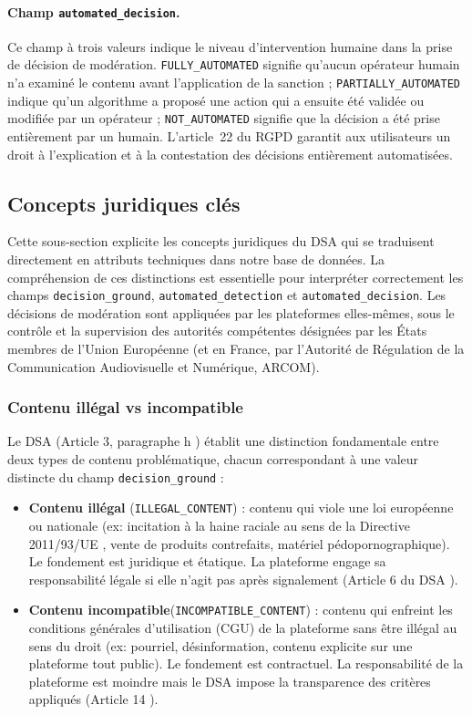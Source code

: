 \documentclass[10pt,twocolumn,a4paper]{article}
\begin{document}
\paragraph{Champ \texttt{automated\_decision}.} Ce champ à trois valeurs indique le niveau d'intervention humaine dans la prise de décision de modération. \texttt{FULLY\_AUTOMATED} signifie qu'aucun opérateur humain n'a examiné le contenu avant l'application de la sanction ; \texttt{PARTIALLY\_AUTOMATED} indique qu'un algorithme a proposé une action qui a ensuite été validée ou modifiée par un opérateur ; \texttt{NOT\_AUTOMATED} signifie que la décision a été prise entièrement par un humain. L'article~22 du RGPD \cite{rgpd} garantit aux utilisateurs un droit à l'explication et à la contestation des décisions entièrement automatisées.


\subsection{Concepts juridiques clés}

Cette sous-section explicite les concepts juridiques du DSA qui se traduisent directement en attributs techniques dans notre base de données. La compréhension de ces distinctions est essentielle pour interpréter correctement les champs \texttt{decision\_ground}, \texttt{automated\_detection} et \texttt{automated\_decision}. Les décisions de modération sont appliquées par les plateformes elles-mêmes, sous le contrôle et la supervision des autorités compétentes désignées par les États membres de l'Union Européenne (et en France, par l'Autorité de Régulation de la Communication Audiovisuelle et Numérique, ARCOM).

\subsubsection{Contenu illégal vs incompatible}

Le DSA (Article 3, paragraphe h \cite{dsa2022}) établit une distinction fondamentale entre deux types de contenu problématique, chacun correspondant à une valeur distincte du champ \texttt{decision\_ground} :

\begin{itemize}
    \item \textbf{Contenu illégal} (\texttt{ILLEGAL\_CONTENT}) : contenu qui viole une loi européenne ou nationale (ex: incitation à la haine raciale au sens de la Directive 2011/93/UE \cite{directive2011}, vente de produits contrefaits, matériel pédopornographique). Le fondement est juridique et étatique. La plateforme engage sa responsabilité légale si elle n'agit pas après signalement (Article 6 du DSA \cite{dsa2022}).
    \item \textbf{Contenu incompatible}(\texttt{INCOMPATIBLE\_CONTENT}) : contenu qui enfreint les conditions générales d'utilisation (CGU) de la plateforme sans être illégal au sens du droit (ex: pourriel, désinformation, contenu explicite sur une plateforme tout public). Le fondement est contractuel. La responsabilité de la plateforme est moindre mais le DSA impose la transparence des critères appliqués (Article 14 \cite{dsa2022}).
\end{itemize}
\end{document}
